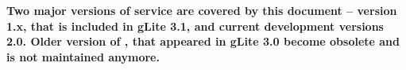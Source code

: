 
\textbf{Two major versions of \LB service are covered by this document -- \LB
version 1.x, that is included in gLite 3.1, and current development versions
2.0. Older version of \LB, that appeared in gLite 3.0 become obsolete and is
not maintained anymore.}

